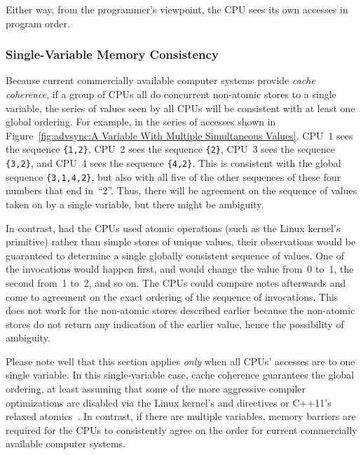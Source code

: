 Either way, from the programmer's viewpoint, the CPU sees its own accesses
in program order.

\subsubsection{Single-Variable Memory Consistency}
\label{sec:advsync:Single-Variable Memory Consistency}

Because current commercially available computer systems provide
\emph{cache coherence},
if a group of CPUs all do concurrent non-atomic stores to a single variable,
the series of values seen by all CPUs will be consistent with at
least one global ordering.
For example, in the series of accesses shown in
Figure~\ref{fig:advsync:A Variable With Multiple Simultaneous Values},
CPU~1 sees the sequence {\tt \{1,2\}},
CPU~2 sees the sequence {\tt \{2\}},
CPU~3 sees the sequence {\tt \{3,2\}},
and
CPU~4 sees the sequence {\tt \{4,2\}}.
This is consistent with the global sequence {\tt \{3,1,4,2\}},
but also with all five of the other sequences of these four numbers that end
in~``2''.
Thus, there will be agreement on the sequence of values taken on
by a single variable, but there might be ambiguity.

In contrast, had the CPUs used atomic operations (such as the Linux kernel's
 primitive) rather than simple stores of
unique values, their observations would
be guaranteed to determine a single globally consistent sequence of values.
One of the  invocations would happen first,
and would change the value from~0 to~1, the second from~1 to~2, and
so on.
The CPUs could compare notes afterwards and come to agreement on the
exact ordering of the sequence of  invocations.
This does not work for the non-atomic stores described earlier because
the non-atomic stores do not return any indication of the earlier value,
hence the possibility of ambiguity.

Please note well that this section applies \emph{only} when all
CPUs' accesses are to one single variable.
In this single-variable case, cache coherence guarantees the
global ordering, at least assuming that some of the more aggressive
compiler optimizations are disabled via the Linux kernel's
 and  directives or C++11's relaxed
atomics~\cite{PeteBecker2011N3242}.
In contrast, if there are multiple variables, memory barriers are
required for the CPUs to consistently agree on the order for current
commercially available computer systems.

